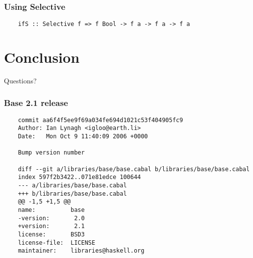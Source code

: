 \documentclass[aspectratio=169]{beamer}
\begin{document}
\begin{frame}[fragile]
  \frametitle{Using Selective}
  \begin{verbatim}
    ifS :: Selective f => f Bool -> f a -> f a -> f a
  \end{verbatim}
\end{frame}

\section{Conclusion}

\begin{frame}
  \Huge{}
  Questions?
\end{frame}

\appendix{}

\begin{frame}[fragile]
  \frametitle{Base 2.1 release}
  \begin{verbatim}
    commit aa6f4f5ee9f69a034fe694d1021c53f404905fc9
    Author: Ian Lynagh <igloo@earth.li>
    Date:   Mon Oct 9 11:40:09 2006 +0000

    Bump version number

    diff --git a/libraries/base/base.cabal b/libraries/base/base.cabal
    index 597f2b3422..071e81edce 100644
    --- a/libraries/base/base.cabal
    +++ b/libraries/base/base.cabal
    @@ -1,5 +1,5 @@
    name:          base
    -version:       2.0
    +version:       2.1
    license:       BSD3
    license-file:  LICENSE
    maintainer:    libraries@haskell.org
  \end{verbatim}
\end{frame}
\end{document}
